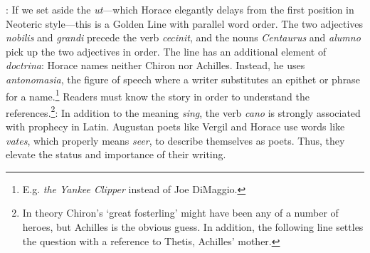 
: If we set aside the \textit{ut}---which Horace elegantly delays from the first position in Neoteric style---this is a Golden Line with parallel word order.  The two adjectives \textit{nobilis} and \textit{grandi} precede the verb \textit{cecinit}, and the nouns \textit{Centaurus} and \textit{alumno} pick up the two adjectives in order.  The line has an additional element of \textit{doctrina}: Horace names neither Chiron nor Achilles.  Instead, he uses \textit{antonomasia}, the figure of speech where a writer substitutes an epithet or phrase for a name.\footnote{E.g. \textit{the Yankee Clipper} instead of Joe DiMaggio.} Readers must know the story in order to understand the references.\footnote{In theory Chiron's `great fosterling' might have been any of a number of heroes, but Achilles is the obvious guess.  In addition, the following line settles the question with a reference to Thetis, Achilles' mother.}\indent{}: In addition to the meaning \textit{sing}, the verb \textit{cano} is strongly associated with prophecy in Latin.  Augustan poets like Vergil and Horace use words like \textit{vates}, which properly means \textit{seer}, to describe themselves as poets.  Thus, they elevate the status and importance of their writing.


